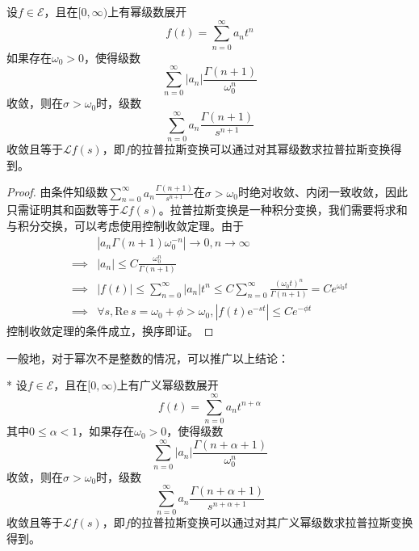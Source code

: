 \begin{theorem}[拉普拉斯变换的级数求法]
    设$f\in\mathcal{E} $，且在$[0,\infty)$上有幂级数展开
    \[f(t)=\sum_{n=0}^{\infty}a_n t^n\]
    如果存在$\omega_0>0$，使得级数
    \[\sum_{n=0}^{\infty}|a_n|\frac{\Gamma(n+1)}{\omega_0^{n}}\]
    收敛，则在$\sigma>\omega_0$时，级数
    \[\sum_{n=0}^{\infty}a_n \frac{\Gamma(n+1)}{s^{n+1}}\]
    收敛且等于$\mathcal{L} f(s)$，即$f$的拉普拉斯变换可以通过对其幂级数求拉普拉斯变换得到。
\end{theorem}
\begin{proof}
    由条件知级数$\sum_{n=0}^{\infty}a_n \frac{\Gamma(n+1)}{s^{n+1}}$在$\sigma>\omega_0$时绝对收敛、内闭一致收敛，因此只需证明其和函数等于$\mathcal{L} f(s)$。拉普拉斯变换是一种积分变换，我们需要将求和与积分交换，可以考虑使用控制收敛定理。由于
    \begin{align*}
        &|a_n \Gamma(n+1)\omega_0^{-n}|\to 0, n\to\infty\\
        \implies &|a_n|\leq C\frac{\omega_0^{n}}{\Gamma(n+1)}\\
        \implies &|f(t)|\leq \sum_{n=0}^{\infty}|a_n|t^n\leq C\sum_{n=0}^{\infty}\frac{(\omega_0 t)^{n}}{\Gamma(n+1)}=Ce^{\omega_0 t}\\
        \implies &\forall s,\text{Re}\ s=\omega_0+\phi>\omega_0,|f(t)\mathrm{e}^{-s t}|\leq Ce^{-\phi t}
    \end{align*}
    控制收敛定理的条件成立，换序即证。
\end{proof}

一般地，对于幂次不是整数的情况，可以推广以上结论：
\begin{corollary}*
   设$f\in\mathcal{E} $，且在$[0,\infty)$上有广义幂级数展开
   \[f(t)=\sum_{n=0}^{\infty}a_n t^{n+\alpha}\]
   其中$0\leq\alpha<1$，如果存在$\omega_0>0$，使得级数
   \[\sum_{n=0}^{\infty}|a_n|\frac{\Gamma(n+\alpha+1)}{\omega_0^{n}}\]
   收敛，则在$\sigma>\omega_0$时，级数
   \[\sum_{n=0}^{\infty}a_n \frac{\Gamma(n+\alpha+1)}{s^{n+\alpha+1}}\]
   收敛且等于$\mathcal{L} f(s)$，即$f$的拉普拉斯变换可以通过对其广义幂级数求拉普拉斯变换得到。
\end{corollary}

